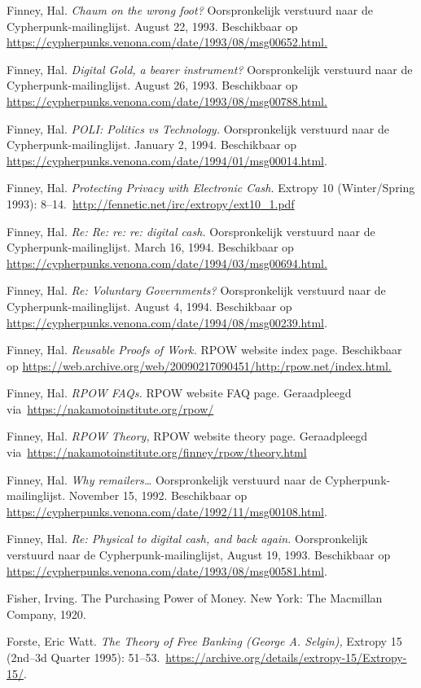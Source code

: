 \documentclass[
  a5paper,
  smalldemyvopaper,11pt,twoside,onecolumn,openright,extrafontsizes,
hidelinks]{memoir}
\begin{document}
Finney, Hal. \emph{Chaum on the wrong foot?} Oorspronkelijk verstuurd
naar de Cypherpunk-mailinglijst. August 22, 1993. Beschikbaar op
\url{https://cypherpunks.venona.com/date/1993/08/msg00652.html.}

Finney, Hal. \emph{Digital Gold, a bearer instrument?} Oorspronkelijk
verstuurd naar de Cypherpunk-mailinglijst. August 26, 1993. Beschikbaar
op \url{https://cypherpunks.venona.com/date/1993/08/msg00788.html.}

Finney, Hal. \emph{POLI: Politics vs Technology.} Oorspronkelijk
verstuurd naar de Cypherpunk-mailinglijst. January 2, 1994. Beschikbaar
op \url{https://cypherpunks.venona.com/date/1994/01/msg00014.html}.

Finney, Hal. \emph{Protecting Privacy with Electronic Cash.} Extropy 10
(Winter/Spring 1993):
8--14.~\url{http://fennetic.net/irc/extropy/ext10_1.pdf}

Finney, Hal. \emph{Re: Re: re: re: digital cash.} Oorspronkelijk
verstuurd naar de Cypherpunk-mailinglijst. March 16, 1994. Beschikbaar
op \url{https://cypherpunks.venona.com/date/1994/03/msg00694.html.}

Finney, Hal. \emph{Re: Voluntary Governments?} Oorspronkelijk verstuurd
naar de Cypherpunk-mailinglijst. August 4, 1994. Beschikbaar op
\url{https://cypherpunks.venona.com/date/1994/08/msg00239.html}.

Finney, Hal. \emph{Reusable Proofs of Work.} RPOW website index page.
Beschikbaar op
\url{https://web.archive.org/web/20090217090451/http:/rpow.net/index.html.}

Finney, Hal. \emph{RPOW FAQs.} RPOW website FAQ page. Geraadpleegd
via~\url{https://nakamotoinstitute.org/rpow/}

Finney, Hal. \emph{RPOW Theory,} RPOW website theory page. Geraadpleegd
via~\url{https://nakamotoinstitute.org/finney/rpow/theory.html}

Finney, Hal. \emph{Why remailers\ldots{}} Oorspronkelijk verstuurd naar
de Cypherpunk-mailinglijst. November 15, 1992. Beschikbaar op
\url{https://cypherpunks.venona.com/date/1992/11/msg00108.html}.

Finney, Hal. \emph{Re: Physical to digital cash, and back again.}
Oorspronkelijk verstuurd naar de Cypherpunk-mailinglijst, August 19,
1993. Beschikbaar op
\url{https://cypherpunks.venona.com/date/1993/08/msg00581.html}.

Fisher, Irving. The Purchasing Power of Money. New York: The Macmillan
Company, 1920.

Forste, Eric Watt. \emph{The Theory of Free Banking (George A. Selgin),}
Extropy 15 (2nd--3d Quarter 1995):
51--53.~\url{https://archive.org/details/extropy-15/Extropy-15/}.
\end{document}
